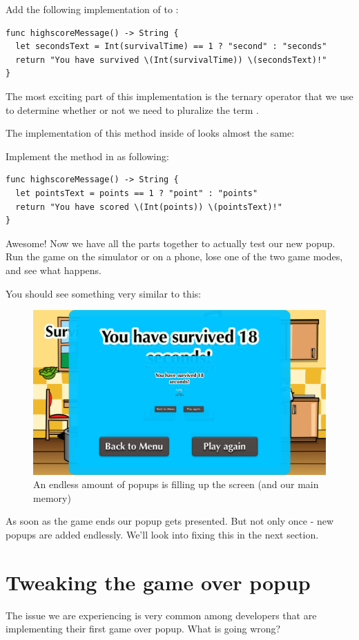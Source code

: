 \begin{leftbar}
Add the following implementation of  to
:
\begin{lstlisting}
func highscoreMessage() -> String {
  let secondsText = Int(survivalTime) == 1 ? "second" : "seconds"
  return "You have survived \(Int(survivalTime)) \(secondsText)!"
}
\end{lstlisting}
\end{leftbar}
The most exciting part of this implementation is the ternary operator that we
use to determine whether or not we need to pluralize the term
. 

The implementation of this method inside of  looks
almost the same:
\begin{leftbar}
Implement the  method in 
as following:
\begin{lstlisting}
func highscoreMessage() -> String {
  let pointsText = points == 1 ? "point" : "points"
  return "You have scored \(Int(points)) \(pointsText)!"
}
\end{lstlisting}
\end{leftbar}
Awesome! Now we have all the parts together to actually test our new popup. Run
the game on the simulator or on a phone, lose one of the two game modes, and see
what happens.

You should see something very similar to this:
\begin{figure}[H]
    \centering
    \includegraphics[width=0.75\linewidth]{images/Chapter7/endless_popups.png}
    \caption{An endless amount of popups is filling up the screen (and our
    main memory)}
\end{figure}
As soon as the game ends our popup gets presented. But not only once - new
popups are added endlessly. We'll look into fixing this in the next section.

\section{Tweaking the game over popup}
The issue we are experiencing is very common among developers that are
implementing their first game over popup. What is going wrong?

